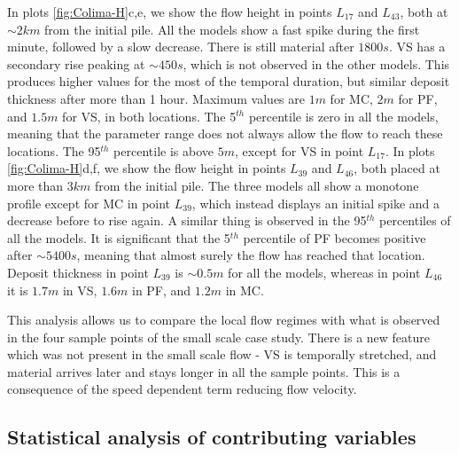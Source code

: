 \documentclass{article}
\begin{document}
In plots \ref{fig:Colima-H}c,e, we show the flow height in points $L_{17}$ and $L_{43}$, both at $\sim 2 km$ from the initial pile. All the models show a fast spike during the first minute, followed by a slow decrease. There is still material after $1800 s$. VS has a secondary rise peaking at $\sim 450 s$, which is not observed in the other models. This produces higher values for the most of the temporal duration, but similar deposit thickness after more than 1 hour. Maximum values are $1 m$ for MC, $2 m$ for PF, and $1.5 m$ for VS, in both locations. The 5$^{th}$ percentile is zero in all the models, meaning that the parameter range does not always allow the flow to reach these locations. The 95$^{th}$ percentile is above $5 m$, except for VS in point $L_{17}$. In plots \ref{fig:Colima-H}d,f, we show the flow height in points $L_{39}$ and $L_{46}$, both placed at more than $3 km$ from the initial pile. The three models all show a monotone profile except for  MC in point $L_{39}$, which instead displays an initial spike and a decrease before to rise again. A similar thing is observed in the 95$^{th}$ percentiles of all the models. It is significant that the 5$^{th}$ percentile of PF becomes positive after $\sim 5400 s$, meaning that almost surely the flow has reached that location. Deposit thickness in point $L_{39}$ is $\sim 0.5 m$ for all the models, whereas in point $L_{46}$ it is $1.7 m$ in VS, $1.6 m$ in PF, and $1.2 m$ in MC.

This analysis allows us to compare the local flow regimes with what is observed in the four sample points of the small scale case study. There is a new feature which was not present in the small scale flow - VS is temporally stretched, and material arrives later and stays longer in all the sample points. This is a consequence of the speed dependent term reducing flow velocity.

\subsection{Statistical analysis of contributing variables}\label{Hq2}
\end{document}
